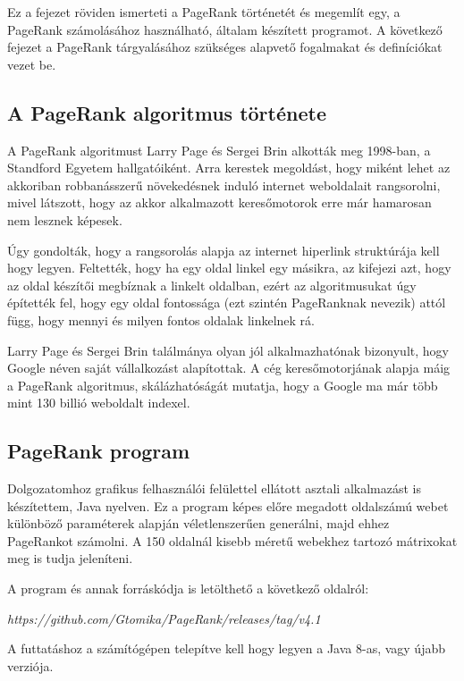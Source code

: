 \documentclass[12pt,a4paper]{article}
\begin{document}
Ez a fejezet röviden ismerteti a PageRank történetét és megemlít egy, a PageRank számolásához használható, általam készített programot. A következő fejezet a PageRank tárgyalásához szükséges alapvető fogalmakat és definíciókat vezet be. 

\subsection{A PageRank algoritmus története}

A PageRank algoritmust Larry Page és Sergei Brin alkották meg 1998-ban, a Standford Egyetem hallgatóiként. Arra kerestek megoldást, hogy miként lehet az akkoriban robbanásszerű növekedésnek induló internet weboldalait rangsorolni, mivel látszott, hogy az akkor alkalmazott keresőmotorok erre már hamarosan nem lesznek képesek.

Úgy gondolták, hogy a rangsorolás alapja az internet hiperlink struktúrája kell hogy legyen. Feltették, hogy ha egy oldal linkel egy másikra, az kifejezi azt, hogy az oldal készítői megbíznak a linkelt oldalban, ezért az algoritmusukat úgy építették fel, hogy egy oldal fontossága (ezt szintén PageRanknak nevezik) attól függ, hogy mennyi és milyen fontos oldalak linkelnek rá.

Larry Page és Sergei Brin találmánya olyan jól alkalmazhatónak bizonyult, hogy Google néven saját vállalkozást alapítottak. A cég keresőmotorjának alapja máig a PageRank algoritmus, skálázhatóságát mutatja, hogy a Google ma már több mint 130 billió weboldalt indexel. 

\subsection{PageRank program}\label{program}

Dolgozatomhoz grafikus felhasználói felülettel ellátott asztali alkalmazást is készítettem, Java nyelven. Ez a program képes előre megadott oldalszámú webet különböző paraméterek alapján véletlenszerűen generálni, majd ehhez PageRankot számolni. A 150 oldalnál kisebb méretű webekhez tartozó mátrixokat meg is tudja jeleníteni.

A program és annak forráskódja is letölthető a következő oldalról:

\vspace{0.3 cm}
\textit{https://github.com/Gtomika/PageRank/releases/tag/v4.1}
\vspace{0.3 cm}

 A futtatáshoz a számítógépen telepítve kell hogy legyen a Java 8-as, vagy újabb verziója.
\end{document}
